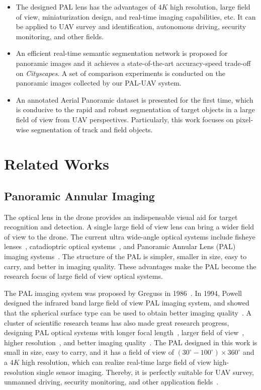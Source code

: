 \documentclass[letterpaper, 10 pt, conference]{ieeeconf}
\begin{document}
\begin{itemize}

\item The designed PAL lens has the advantages of $4K$ high resolution, large field of view, miniaturization design, and real-time imaging capabilities, etc. It can be applied to UAV survey and identification, autonomous driving, security monitoring, and other fields.
\item An efficient real-time semantic segmentation network is proposed for panoramic images and it achieves a state-of-the-art accuracy-speed trade-off on \emph{Cityscapes}. A set of comparison experiments is conducted on the panoramic images collected by our PAL-UAV system. 
\item An annotated Aerial Panoramic dataset is presented for the first time, which is conducive to the rapid and robust segmentation of target objects in a large field of view from UAV perspectives. Particularly, this work focuses on pixel-wise segmentation of track and field objects.
\end{itemize}
\section{Related Works}

\subsection{Panoramic Annular Imaging}

The optical lens in the drone provides an indispensable visual aid for target recognition and detection. A single large field of view lens can bring a wider field of view to the drone.
The current ultra wide-angle optical systems include fisheye lenses~\cite{fisheye}, catadioptric optical systems~\cite{catadioptric}, and Panoramic Annular Lens (PAL) imaging systems~\cite{panoramic_lens}.
The structure of the PAL is simpler, smaller in size, easy to carry, and better in imaging quality. These advantages make the PAL become the research focus of large field of view optical systems.

The PAL imaging system was proposed by Greguss in 1986~\cite{greguss1986panoramic}. In 1994, Powell designed the infrared band large field of view PAL imaging system, and showed that the spherical surface type can be used to obtain better imaging quality~\cite{powell}.
A cluster of scientific research teams has also made great research progress, designing PAL optical systems with longer focal length~\cite{niu}, larger field of view~\cite{large_field_of_view}, higher resolution~\cite{wang2019design}, and better imaging quality~\cite{high-perfoemance}.
The PAL designed in this work is small in size, easy to carry, and it has a field of view of $(30^\circ-100^\circ)\times360^\circ$
and a $4K$ high resolution, which can realize real-time large field of view high-resolution single sensor imaging. Thereby, it is perfectly suitable for UAV survey, unmanned driving, security monitoring, and other application fields~\cite{fang2020cfvl,chen2021panoramic}.
\end{document}
